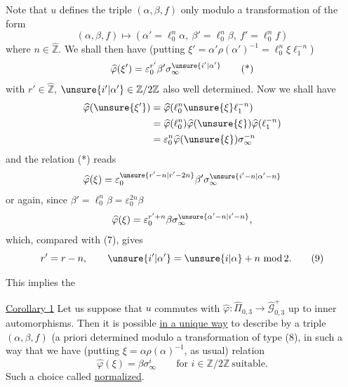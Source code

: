 Note that $u$ defines the triple $(\alpha,\beta,f)$ only modulo
a transformation of the form
\[
(\alpha,\beta,f)\longmapsto
(\alpha'=\ell_0^n\alpha,\ \beta'=\ell_0^n\beta,\ f'=\ell_0^n f)
\tag{8}
\]
where $n\in\widehat{\mathbb Z}$. We shall then have (putting
$\xi'=\alpha'\rho(\alpha')^{-1}=\ell_0^n\xi\ell_1^{-n}$)
\[
\widehat\varphi(\xi')=\varepsilon_0^{r'}\beta'
\sigma_\infty^{\unsure{i'|\alpha'}}
\tag{*}
\]
with $r'\in\widehat{\mathbb Z}$,
$\unsure{i'|\alpha'}\in\mathbb Z/2\mathbb Z$ also well determined.
Now we shall have
\[
\begin{aligned}
\widehat\varphi(\unsure{\xi'})
 &=\widehat\varphi(\ell_0^n\unsure{\xi}\ell_1^{-n})\\
 &=\widehat\varphi(\ell_0^n)\widehat\varphi(\unsure{\xi})
   \widehat\varphi(\ell_1^{-n})\\
 &=\varepsilon_0^n\widehat\varphi(\unsure{\xi})\sigma_\infty^{-n}
\end{aligned}
\]
and the relation (*) reads
\[
\widehat\varphi(\xi)=\varepsilon_0^{\unsure{r'-n|r'-2n}}\beta'
\sigma_\infty^{\unsure{i'-n|\alpha'-n}}
\]
or again, since $\beta'=\ell_0^n\beta=\varepsilon_0^{2n}\beta$
\[
\widehat\varphi(\xi)=\varepsilon_0^{r'+n}\beta
\sigma_\infty^{\unsure{\alpha'-n|i'-n}},
\]
which, compared with (7), gives
\[
r'=r-n,\qquad\unsure{i'|\alpha'}=\unsure{i|\alpha}+n\ \mathrm{mod}\,2.
\tag{9}
\]


This implies the

\uline{Corollary 1} Let us suppose that $u$ commutes with
$\widehat\varphi:\widehat\Pi_{0,3}\longrightarrow
\widehat{\mathcal G}_{0,3}^{+}$ up to inner automorphisms. Then it is possible
\uline{in a unique way} to describe  by a triple
$(\alpha,\beta,f)$ (a priori determined modulo a transformation of type (8),
in such a way that we have (putting $\xi=\alpha\rho(\alpha)^{-1}$,
as usual)  relation
\[
\boxed{\widehat\varphi(\xi)=\beta\sigma_\infty^i}
\qquad\text{for }i\in\mathbb Z/2\mathbb Z\ \text{suitable}.
\tag{10}
\]
Such a choice  called \uline{normalized}.

